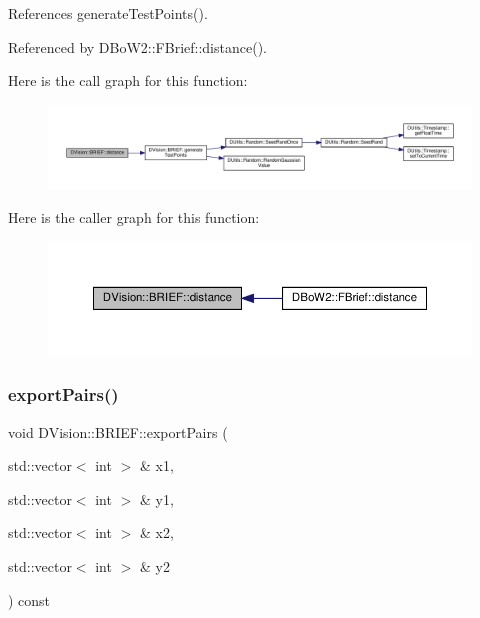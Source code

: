 References generate\+Test\+Points().



Referenced by D\+Bo\+W2\+::\+F\+Brief\+::distance().

Here is the call graph for this function\+:\nopagebreak
\begin{figure}[H]
\begin{center}
\leavevmode
\includegraphics[width=350pt]{classDVision_1_1BRIEF_a78718071fcf2700e3a0cc304dd4e1dcc_cgraph}
\end{center}
\end{figure}
Here is the caller graph for this function\+:\nopagebreak
\begin{figure}[H]
\begin{center}
\leavevmode
\includegraphics[width=350pt]{classDVision_1_1BRIEF_a78718071fcf2700e3a0cc304dd4e1dcc_icgraph}
\end{center}
\end{figure}
\mbox{\label{classDVision_1_1BRIEF_a8000a709f6336e47359c6e9ee4a5efd5}} 
\subsubsection{\texorpdfstring{export\+Pairs()}{exportPairs()}}
{\footnotesize\ttfamily void D\+Vision\+::\+B\+R\+I\+E\+F\+::export\+Pairs (\begin{DoxyParamCaption}\item[{std\+::vector$<$ int $>$ \&}]{x1,  }\item[{std\+::vector$<$ int $>$ \&}]{y1,  }\item[{std\+::vector$<$ int $>$ \&}]{x2,  }\item[{std\+::vector$<$ int $>$ \&}]{y2 }\end{DoxyParamCaption}) const\hspace{0.3cm}{\ttfamily [inline]}}

